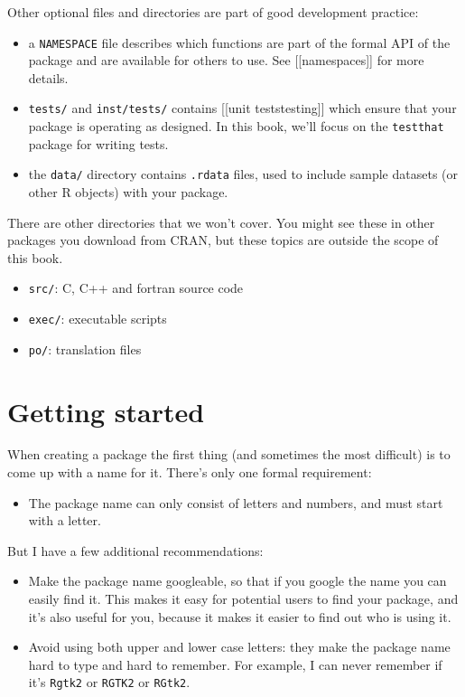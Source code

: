 Other optional files and directories are part of good development
practice:

\begin{itemize}
\item
  a \texttt{NAMESPACE} file describes which functions are part of the
  formal API of the package and are available for others to use. See
  {[}{[}namespaces{]}{]} for more details.
\item
  \texttt{tests/} and \texttt{inst/tests/} contains {[}{[}unit
  tests\textbar{}testing{]}{]} which ensure that your package is
  operating as designed. In this book, we'll focus on the
  \texttt{testthat} package for writing tests.
\item
  the \texttt{data/} directory contains \texttt{.rdata} files, used to
  include sample datasets (or other R objects) with your package.
\end{itemize}

There are other directories that we won't cover. You might see these in
other packages you download from CRAN, but these topics are outside the
scope of this book.

\begin{itemize}
\item
  \texttt{src/}: C, C++ and fortran source code
\item
  \texttt{exec/}: executable scripts
\item
  \texttt{po/}: translation files
\end{itemize}

\section{Getting started}

When creating a package the first thing (and sometimes the most
difficult) is to come up with a name for it. There's only one formal
requirement:

\begin{itemize}
\itemsep1pt\parskip0pt
\item
  The package name can only consist of letters and numbers, and must
  start with a letter.
\end{itemize}

But I have a few additional recommendations:

\begin{itemize}
\item
  Make the package name googleable, so that if you google the name you
  can easily find it. This makes it easy for potential users to find
  your package, and it's also useful for you, because it makes it easier
  to find out who is using it.
\item
  Avoid using both upper and lower case letters: they make the package
  name hard to type and hard to remember. For example, I can never
  remember if it's \texttt{Rgtk2} or \texttt{RGTK2} or \texttt{RGtk2}.
\end{itemize}

